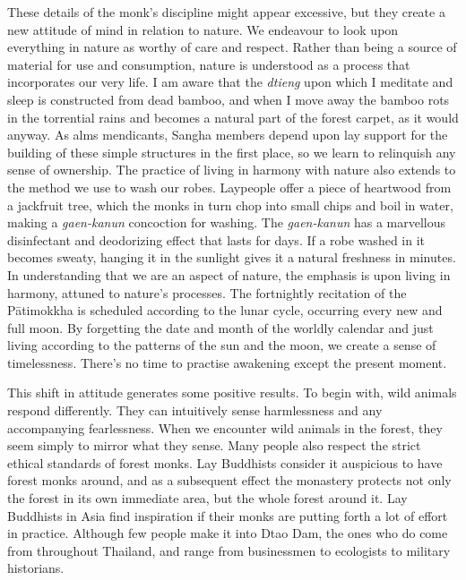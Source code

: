These details of the monk's discipline might appear excessive, but they
create a new attitude of mind in relation to nature. We endeavour to
look upon everything in nature as worthy of care and respect. Rather
than being a source of material for use and consumption, nature is
understood as a process that incorporates our very life. I am aware that
the \emph{dtieng} upon which I meditate and sleep is constructed from
dead bamboo, and when I move away the bamboo rots in the torrential
rains and becomes a natural part of the forest carpet, as it would
anyway. As alms mendicants, Sangha members depend upon lay support for
the building of these simple structures in the first place, so we learn
to relinquish any sense of ownership. The practice of living in harmony
with nature also extends to the method we use to wash our robes.
Laypeople offer a piece of heartwood from a jackfruit tree, which the
monks in turn chop into small chips and boil in water, making a
\emph{gaen-kanun} concoction for washing. The \emph{gaen-kanun} has a
marvellous disinfectant and deodorizing effect that lasts for days. If a
robe washed in it becomes sweaty, hanging it in the sunlight gives it a
natural freshness in minutes. In understanding that we are an aspect of
nature, the emphasis is upon living in harmony, attuned to nature's
processes. The fortnightly recitation of the Pātimokkha is scheduled
according to the lunar cycle, occurring every new and full moon. By
forgetting the date and month of the worldly calendar and just living
according to the patterns of the sun and the moon, we create a sense of
timelessness. There's no time to practise awakening except the present
moment.

This shift in attitude generates some positive results. To begin with,
wild animals respond differently. They can intuitively sense
harmlessness and any accompanying fearlessness. When we encounter wild
animals in the forest, they seem simply to mirror what they sense. Many
people also respect the strict ethical standards of forest monks. Lay
Buddhists consider it auspicious to have forest monks around, and as a
subsequent effect the monastery protects not only the forest in its own
immediate area, but the whole forest around it. Lay Buddhists in Asia
find inspiration if their monks are putting forth a lot of effort in
practice. Although few people make it into Dtao Dam, the ones who do
come from throughout Thailand, and range from businessmen to ecologists
to military historians.

